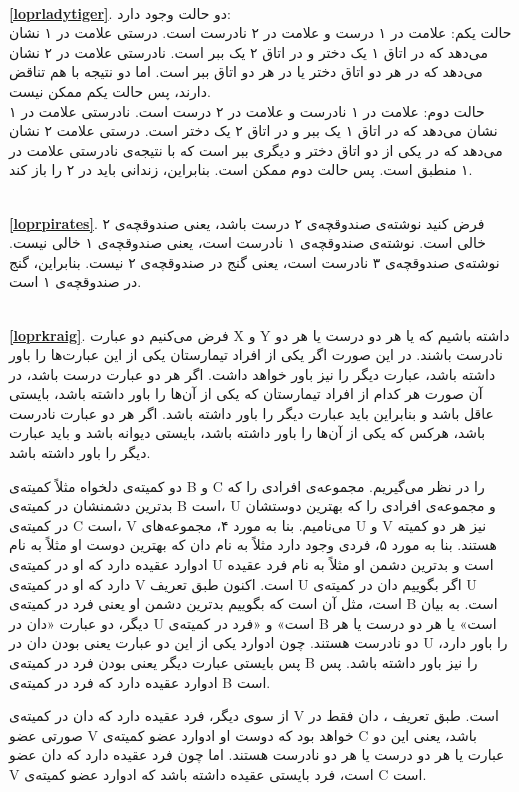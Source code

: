 \df \\ \textbf{\ref{loprladytiger}}.
دو حالت وجود دارد: \\
حالت یکم: علامت در ۱ درست و علامت در ۲ نادرست است. درستی علامت در ۱ نشان می‌دهد که در اتاق ۱ یک دختر و در اتاق ۲ یک ببر است. نادرستی علامت در ۲ نشان می‌دهد که در هر دو اتاق دختر یا در هر دو اتاق ببر است. اما دو نتیجه با هم تناقض دارند، پس حالت یکم ممکن نیست. \\
حالت دوم:  علامت در ۱ نادرست و علامت در ۲ درست است. نادرستی علامت در ۱ نشان می‌دهد که در اتاق ۱ یک ببر و در اتاق ۲ یک دختر است. درستی علامت ۲ نشان می‌دهد که در یکی از دو اتاق دختر و دیگری ببر است که با نتیجه‌ی نادرستی علامت در ۱ منطبق است. پس حالت دوم ممکن است. بنابراین، زندانی باید در ۲ را باز کند.

\df \\ \textbf{\ref{loprpirates}}.
فرض کنید نوشته‌ی صندوقچه‌ی ۲ درست باشد، یعنی صندوقچه‌ی ۲ خالی است. نوشته‌ی صندوقچه‌ی ۱ نادرست است، یعنی صندوقچه‌ی ۱ خالی نیست. نوشته‌ی صندوقچه‌ی ۳ نادرست است، یعنی گنج در صندوقچه‌ی ۲ نیست. بنابراین، گنج در صندوقچه‌ی ۱ است.

\df \\ \textbf{\ref{loprkraig}}.
فرض می‌کنیم دو عبارت X و Y داشته باشیم که یا هر دو درست یا هر دو نادرست باشند. در این صورت اگر یکی از افراد تیمارستان یکی از این عبارت‌ها را باور داشته باشد، عبارت دیگر را نیز باور خواهد داشت. اگر هر دو عبارت درست باشد، در آن صورت هر کدام از افراد تیمارستان که یکی 	از آن‌ها را باور داشته باشد، بایستی عاقل باشد و بنابراین باید عبارت دیگر را باور داشته باشد. اگر هر دو عبارت نادرست باشد، هرکس که یکی از آن‌ها را باور داشته باشد، بایستی دیوانه باشد و باید عبارت دیگر را باور داشته باشد.

دو کمیته‌ی دلخواه مثلاً کمیته‌ی B و C را در نظر می‌گیریم. مجموعه‌ی افرادی را که بدترین دشمنشان در کمیته‌ی B است، U و مجموعه‌ی افرادی را که بهترین دوستشان در کمیته‌ی C است، V می‌نامیم. بنا به مورد ۴، مجموعه‌های U و V نیز هر دو کمیته هستند. بنا به مورد ۵، فردی وجود دارد مثلاً به نام دان که بهترین دوست او مثلاً به نام ادوارد عقیده دارد که او در کمیته‌ی U است و بدترین دشمن او مثلاً به نام فرد عقیده دارد که او در کمیته‌ی V است. اکنون طبق تعریف U اگر بگوییم دان در کمیته‌ی U است، مثل آن است که بگوییم بدترین دشمن او یعنی فرد در کمیته‌ی B است. به بیان دیگر، دو عبارت «دان در U است» و «فرد در کمیته‌ی B است» یا هر دو درست یا هر دو نادرست هستند. چون ادوارد یکی از این دو عبارت یعنی بودن دان در U را باور دارد، پس بایستی عبارت دیگر یعنی بودن فرد در کمیته‌ی B را نیز باور داشته باشد. پس ادوارد عقیده دارد که فرد در کمیته‌ی B است.

از سوی دیگر، فرد عقیده دارد که دان در کمیته‌ی V است. طبق تعریف ، دان فقط در صورتی عضو V خواهد بود که دوست او ادوارد عضو کمیته‌ی C باشد، یعنی این دو عبارت یا هر دو درست یا هر دو نادرست هستند. اما چون فرد عقیده دارد که دان عضو V است، فرد بایستی عقیده داشته باشد که ادوارد عضو کمیته‌ی C است.

